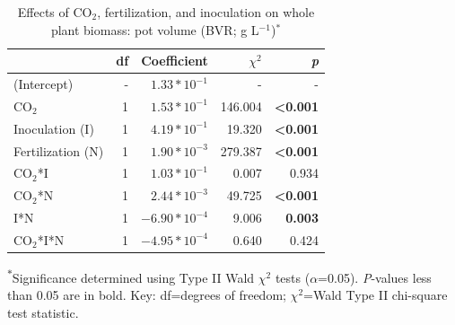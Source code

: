\begin{table}[]
    \centering
    \caption[Effects of CO$_2$, fertilization, and inoculation on whole plant biomass: pot volume]{Effects of CO$_2$, fertilization, and inoculation on whole plant biomass: pot volume (BVR; g L$^{-1}$)$^*$}
    \label{table:tab.d3}
        \begin{tabular}{p{3.5cm}p{0.5cm}p{1.75cm}p{1.5cm}p{1.5cm}}
            \hline
            & \multicolumn{1}{r}{df} & \multicolumn{1}{r}{Coefficient}    & \multicolumn{1}{r}{$\chi^2$}  & \multicolumn{1}{r}{\textit{p}}
            \\
            \hline
    (Intercept)       & \multicolumn{1}{r}{-}       & \multicolumn{1}{r}{$1.33*10^{-1}$}    & \multicolumn{1}{r}{-}         & \multicolumn{1}{r}{-}               \\
    CO$_2$               & \multicolumn{1}{r}{1}    & \multicolumn{1}{r}{$1.53*10^{-1}$}    & \multicolumn{1}{r}{146.004}   & \multicolumn{1}{r}{\textbf{<0.001}} \\
    Inoculation (I)   & \multicolumn{1}{r}{1}       & \multicolumn{1}{r}{$4.19*10^{-1}$}    & \multicolumn{1}{r}{19.320}    & \multicolumn{1}{r}{\textbf{<0.001}} \\
    Fertilization (N) & \multicolumn{1}{r}{1}       & \multicolumn{1}{r}{$1.90*10^{-3}$}    & \multicolumn{1}{r}{279.387}   & \multicolumn{1}{r}{\textbf{<0.001}} \\
    CO$_2$*I             & \multicolumn{1}{r}{1}    & \multicolumn{1}{r}{$1.03*10^{-1}$}    & \multicolumn{1}{r}{0.007}     & \multicolumn{1}{r}{0.934}           \\
    CO$_2$*N             & \multicolumn{1}{r}{1}    & \multicolumn{1}{r}{$2.44*10^{-3}$}    & \multicolumn{1}{r}{49.725}    & \multicolumn{1}{r}{\textbf{<0.001}} \\
    I*N               & \multicolumn{1}{r}{1}       & \multicolumn{1}{r}{$-6.90*10^{-4}$}   & \multicolumn{1}{r}{9.006}     & \multicolumn{1}{r}{\textbf{0.003}}  \\
    CO$_2$*I*N           & \multicolumn{1}{r}{1}    & \multicolumn{1}{r}{$-4.95*10^{-4}$}   & \multicolumn{1}{r}{0.640}     & \multicolumn{1}{r}{0.424} \\
    \hline
    \end{tabular}%
\end{table}
\begin{singlespace}
    \noindent \textsuperscript{$*$}Significance determined using Type II Wald $\chi^2$ tests ($\alpha$=0.05). \textit{P}-values less than 0.05 are in bold. Key: df=degrees of freedom; $\chi^2$=Wald Type II chi-square test statistic.
\end{singlespace}
\clearpage

